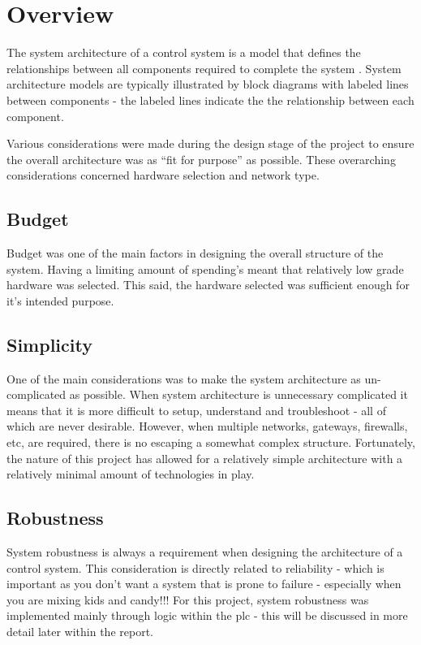 \section{Overview}
    The system architecture of a control system is a model that defines the relationships between all  components required to complete the system \remCite . System architecture models are typically illustrated by block diagrams with labeled lines between components - the labeled lines indicate the the relationship between each component. 

    Various considerations were made during the design stage of the project to ensure the overall architecture was as “fit for purpose” as possible. These overarching considerations concerned hardware selection and network type.

    \subsection{Budget}
        Budget was one of the main factors in designing the overall structure of the system. Having a limiting amount of spending's meant that relatively low grade hardware was selected. This said, the hardware selected was sufficient enough for it’s intended purpose.

    \subsection{Simplicity}
        One of the main considerations was to make the system architecture as un-complicated as possible. When system architecture is unnecessary complicated it means that it is more difficult to setup, understand and troubleshoot - all of which are never desirable. However, when multiple networks, gateways, firewalls, etc, are required, there is no escaping a somewhat complex structure. Fortunately, the nature of this project has allowed for a relatively simple architecture with a relatively minimal amount of technologies in play.
    
    \subsection{Robustness}
        System robustness is always a requirement when designing the architecture of a control system. This consideration is directly related to reliability - which is important as you don’t want a system that is prone to failure - especially when you are mixing kids and candy!!! For this project, system robustness was implemented mainly through logic within the \acrshort{plc} - this will be discussed in more detail later within the report. 
    
